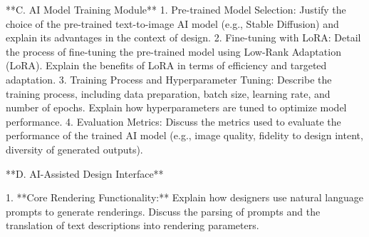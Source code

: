 \documentclass{article}
\begin{document}
   **C. AI Model Training Module**
      1. Pre-trained Model Selection: Justify the choice of the pre-trained text-to-image AI model (e.g., Stable Diffusion) and explain its advantages in the context of design.
      2. Fine-tuning with LoRA: Detail the process of fine-tuning the pre-trained model using Low-Rank Adaptation (LoRA).  Explain the benefits of LoRA in terms of efficiency and targeted adaptation.
      3. Training Process and Hyperparameter Tuning: Describe the training process, including data preparation, batch size, learning rate, and number of epochs.  Explain how hyperparameters are tuned to optimize model performance.
      4. Evaluation Metrics:  Discuss the metrics used to evaluate the performance of the trained AI model (e.g., image quality, fidelity to design intent, diversity of generated outputs).

   **D. AI-Assisted Design Interface**

      1.  **Core Rendering Functionality:** Explain how designers use natural language prompts to generate renderings. Discuss the parsing of prompts and the translation of text descriptions into rendering parameters.
\end{document}
